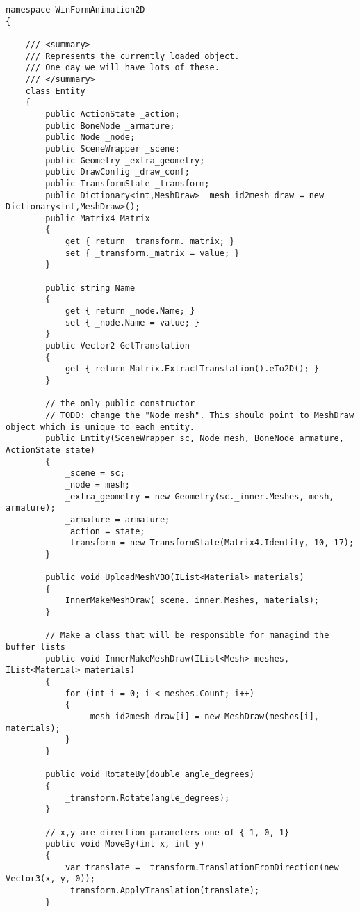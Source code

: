 \begin{scriptsize}
\begin{verbatim}
namespace WinFormAnimation2D
{

    /// <summary>
    /// Represents the currently loaded object.
    /// One day we will have lots of these.
    /// </summary>
    class Entity
    {
        public ActionState _action;
        public BoneNode _armature;
        public Node _node;
        public SceneWrapper _scene;
        public Geometry _extra_geometry;
        public DrawConfig _draw_conf;
        public TransformState _transform;
        public Dictionary<int,MeshDraw> _mesh_id2mesh_draw = new Dictionary<int,MeshDraw>();
        public Matrix4 Matrix
        {
            get { return _transform._matrix; }
            set { _transform._matrix = value; }
        }

        public string Name
        {
            get { return _node.Name; }
            set { _node.Name = value; }
        }
        public Vector2 GetTranslation
        {
            get { return Matrix.ExtractTranslation().eTo2D(); }
        }

        // the only public constructor
        // TODO: change the "Node mesh". This should point to MeshDraw object which is unique to each entity.
        public Entity(SceneWrapper sc, Node mesh, BoneNode armature, ActionState state)
        {
            _scene = sc;
            _node = mesh;
            _extra_geometry = new Geometry(sc._inner.Meshes, mesh, armature);
            _armature = armature;
            _action = state;
            _transform = new TransformState(Matrix4.Identity, 10, 17);
        }

        public void UploadMeshVBO(IList<Material> materials)
        {
            InnerMakeMeshDraw(_scene._inner.Meshes, materials);
        }

        // Make a class that will be responsible for managind the buffer lists
        public void InnerMakeMeshDraw(IList<Mesh> meshes, IList<Material> materials)
        {
            for (int i = 0; i < meshes.Count; i++)
            {
                _mesh_id2mesh_draw[i] = new MeshDraw(meshes[i], materials);
            }
        }

        public void RotateBy(double angle_degrees)
        {
            _transform.Rotate(angle_degrees);
        }

        // x,y are direction parameters one of {-1, 0, 1}
        public void MoveBy(int x, int y)
        {
            var translate = _transform.TranslationFromDirection(new Vector3(x, y, 0));
            _transform.ApplyTranslation(translate);
        }


\end{verbatim}
\end{scriptsize}
